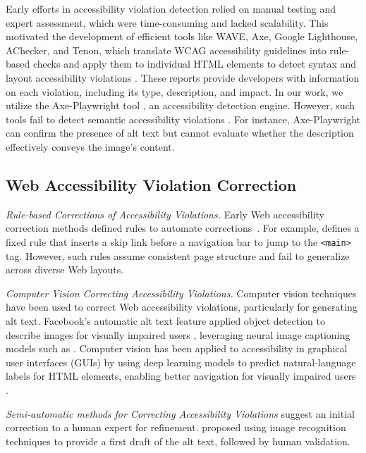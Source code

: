 \documentclass[sigconf, nonacm]{acmart}
\begin{document}
Early efforts in accessibility violation detection relied on manual testing and expert assessment, which were time-consuming and lacked scalability. This motivated the development of efficient tools like WAVE, Axe, Google Lighthouse, AChecker, and Tenon, which translate WCAG accessibility guidelines into rule-based checks and apply them to individual HTML elements to detect syntax and layout accessibility violations \cite{DBLP:series/hci/YesiladaH19}. These reports provide developers with information on each violation, including its type, description, and impact. In our work, we utilize the Axe-Playwright tool \cite{PlaywrightAPI}, an accessibility detection engine. However, such tools fail to detect semantic accessibility violations \cite{lopez2024turning}. For instance, Axe-Playwright can confirm the presence of alt text but cannot evaluate whether the description effectively conveys the image's content. 

\subsection{Web Accessibility Violation Correction}
\emph{Rule-based Corrections of Accessibility Violations. }  
Early Web accessibility correction methods defined rules to automate corrections~\cite{DBLP:conf/hci/FeratiS16, DBLP:conf/wse/CesaranoFT07, DBLP:conf/icisdm/AlmasoudM19, tuan2012checking}. For example, \cite{DBLP:conf/hci/FeratiS16} defines a fixed rule that inserts a skip link before a navigation bar to jump to the \texttt{<main>} tag. However, such rules assume consistent page structure and fail to generalize across diverse Web layouts.

\emph{Computer Vision Correcting Accessibility Violations. } 
Computer vision techniques have been used to correct Web accessibility violations, particularly for generating alt text. Facebook's automatic alt text feature applied object detection to describe images for visually impaired users \cite{DBLP:conf/cscw/WuWFS17}, leveraging neural image captioning models such as \cite{DBLP:conf/cvpr/VinyalsTBE15}. Computer vision has been applied to accessibility in graphical user interfaces (GUIs) by using deep learning models to predict natural-language labels for HTML elements, enabling better navigation for visually impaired users \cite{DBLP:conf/emnlp/LiLHZLG20, DBLP:conf/icse/ChenCXXZ0W20}.

\emph{Semi-automatic methods for Correcting Accessibility Violations } suggest an initial correction to a human expert for refinement. \cite{DBLP:conf/ccnc/MangiatordiL18, DBLP:conf/hcomp/SalisburyKM17, DBLP:journals/taccess/PereiraGRGD24} proposed using image recognition techniques to provide a first draft of the alt text, followed by human validation. 
\end{document}
